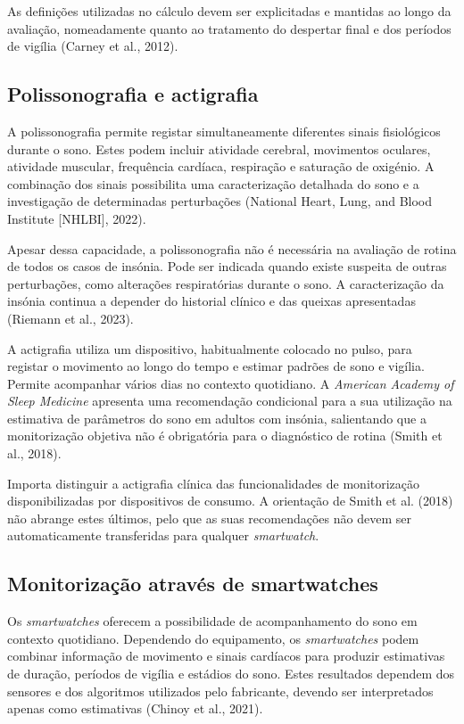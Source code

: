 As definições utilizadas no cálculo devem ser explicitadas e mantidas ao longo da avaliação, nomeadamente quanto ao tratamento do despertar final e dos períodos de vigília (Carney et al., 2012).

\subsection{Polissonografia e actigrafia}
\label{sec:chap2_polissonografia}

A polissonografia permite registar simultaneamente diferentes sinais fisiológicos durante o sono. Estes podem incluir atividade cerebral, movimentos oculares, atividade muscular, frequência cardíaca, respiração e saturação de oxigénio. A combinação dos sinais possibilita uma caracterização detalhada do sono e a investigação de determinadas perturbações (National Heart, Lung, and Blood Institute [NHLBI], 2022).

Apesar dessa capacidade, a polissonografia não é necessária na avaliação de rotina de todos os casos de insónia. Pode ser indicada quando existe suspeita de outras perturbações, como alterações respiratórias durante o sono. A caracterização da insónia continua a depender do historial clínico e das queixas apresentadas (Riemann et al., 2023).

A actigrafia utiliza um dispositivo, habitualmente colocado no pulso, para registar o movimento ao longo do tempo e estimar padrões de sono e vigília. Permite acompanhar vários dias no contexto quotidiano. A\textit{ American Academy of Sleep Medicine} apresenta uma recomendação condicional para a sua utilização na estimativa de parâmetros do sono em adultos com insónia, salientando que a monitorização objetiva não é obrigatória para o diagnóstico de rotina (Smith et al., 2018).

Importa distinguir a actigrafia clínica das funcionalidades de monitorização disponibilizadas por dispositivos de consumo. A orientação de Smith et al. (2018) não abrange estes últimos, pelo que as suas recomendações não devem ser automaticamente transferidas para qualquer \textit{smartwatch}.

\subsection{Monitorização através de smartwatches}
\label{sec:chap2_monitoringSmartWatch}

Os \textit{smartwatches} oferecem a possibilidade de acompanhamento do sono em contexto quotidiano. Dependendo do equipamento, os \textit{smartwatches} podem combinar informação de movimento e sinais cardíacos para produzir estimativas de duração, períodos de vigília e estádios do sono. Estes resultados dependem dos sensores e dos algoritmos utilizados pelo fabricante, devendo ser interpretados apenas como estimativas (Chinoy et al., 2021).

